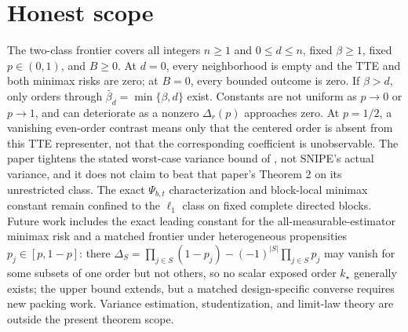 \documentclass{article}
\begin{document}
\section{Honest scope}

The two-class frontier covers all integers \(n\ge1\) and \(0\le d\le n\), fixed \(\beta\ge1\), fixed \(p\in(0,1)\), and \(B\ge0\). At \(d=0\), every neighborhood is empty and the TTE and both minimax risks are zero; at \(B=0\), every bounded outcome is zero. If \(\beta>d\), only orders through \(\bar\beta_d=\min\{\beta,d\}\) exist. Constants are not uniform as \(p\to0\) or \(p\to1\), and can deteriorate as a nonzero \(\Delta_r(p)\) approaches zero. At \(p=1/2\), a vanishing even-order contrast means only that the centered order is absent from this TTE representer, not that the corresponding coefficient is unobservable. The paper tightens the stated worst-case variance bound of \cite{CortezRodriguezEichhornYu2023}, not SNIPE's actual variance, and it does not claim to beat that paper's Theorem 2 on its unrestricted class. The exact \(\Psi_{b,t}\) characterization and block-local minimax constant remain confined to the \(\ell_1\) class on fixed complete directed blocks. Future work includes the exact leading constant for the all-measurable-estimator minimax risk and a matched frontier under heterogeneous propensities \(p_j\in[p,1-p]\): there \(\Delta_S=\prod_{j\in S}(1-p_j)-(-1)^{|S|}\prod_{j\in S}p_j\) may vanish for some subsets of one order but not others, so no scalar exposed order \(k_\star\) generally exists; the upper bound extends, but a matched design-specific converse requires new packing work. Variance estimation, studentization, and limit-law theory are outside the present theorem scope.
\end{document}
